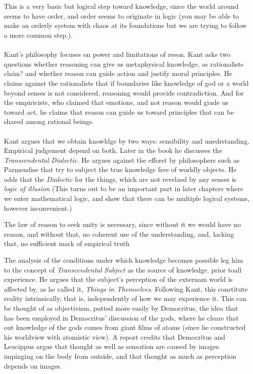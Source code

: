 \documentclass[9pt,a4paper,twocolumn]{article}
\begin{document}
                \\
                \\
                This is a very basic but logical step toward knowledge, since the world around seems to have order, and order seems to originate in logic (you may be able to make an orderly system with chaos at its foundations but we are trying to follow a more common step.).\cite{Kuppers2018-vv}
                \\
                \\
                Kant's philosophy focuses on power and limitations of reson. Kant asks two questions whether reasoning can give us metaphysical knowledge, as rationalists claim? and whether reason can guide action and justify moral principles. He claims against the rationalists that if boundaries like knowledge of god or a world beyond senses is not considered, reasoning would provide contradiction. And for the empiricists, who claimed that emotions, and not reason would giude us toward act, he claims that reason can guide us toward principles that can be shared among rational beings.
                \\
                \\
                Kant argues that we obtain knowldge by two ways: sensibility and unedrstanding. Empirical judgement depend on both. Later in the book he discusses the \textit{Transcendental Dialectic}. He argues against the efforst by philosophers such as Parmendise that try to subject the true knowledge free of worldly objects. He adds that the \textit{Dialectic} for the things, which are not revelaed by any senses is \textit{logic of illusion} (This turns out to be an important part in later chapters where we enter mathematical logic, and show that there can be multiple logical systems, however inconvenient.)\cite{sep-kant-reason}
                \begin{qt}
                    The law of reason to seek unity is necessary, since without it we would have no reason, and without that, no coherent use of the understanding, and, lacking that, no sufficient mark of empirical truth
                \end{qt}
                The analysis of the conditions under which knowledge becomes possible leg him to the concept of \textit{Transcendental Subject} as the source of knowledge. prior toall experience. He argues that the subject's perception of the externam world is affected by, as he called it, \textit{Things in Themselves}. Following Kant, this constitute reality intrinsically, that is, independently of how we may experience it. This can be thought of as objectivism, putted more easily by Democritus, the idea that has been employed in Democritus' discussion of the gods, where he clears that out knowledge of the gods comes from giant films of atoms (since he constructed his worldview with atomistic view). A report credits that Democritus and Leucippus argue that thought as well as sensation are caused by images impinging on the body from outside, and that thought as much as perception depends on images.\cite{Cartledge1998-CARDTG-3}\cite{sep-democritus}\cite{Graham2010-th}
\end{document}
